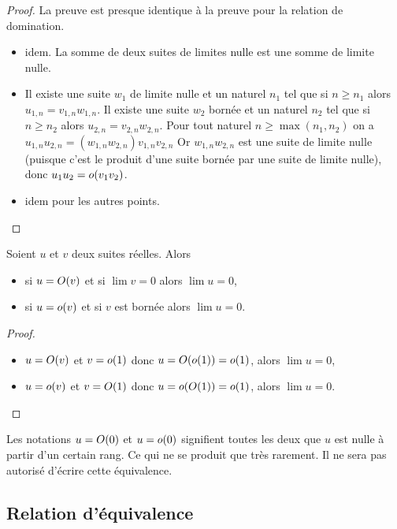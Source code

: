 \begin{proof}
  La preuve est presque identique à la preuve pour la relation de domination.
  \begin{itemize}
  \item idem. La somme de deux suites de limites nulle est une somme de limite nulle.
  \item Il existe une suite \(w_1\) de limite nulle et un naturel \(n_1\) tel que si \(n \geqslant n_1\) alors \(u_{1,n}=v_{1,n} w_{1,n}\). Il existe une suite \(w_2\) bornée et un naturel \(n_2\) tel que si \(n \geqslant n_2\) alors \(u_{2,n}=v_{2,n} w_{2,n}\). Pour tout naturel \(n \geqslant \max(n_1,n_2)\) on a \(u_{1,n}u_{2,n} = (w_{1,n}w_{2,n}) v_{1,n}v_{2,n}\) Or \(w_{1,n}w_{2,n}\) est une suite de limite nulle (puisque c'est le produit d'une suite bornée par une suite de limite nulle), donc \(u_1u_2=o\mathopen{}\left(v_1 v_2\right)\).
  \item idem pour les autres points.
  \end{itemize}
\end{proof}
\begin{prop}
  Soient \(u\) et \(v\) deux suites réelles. Alors
  \begin{itemize}
  \item si \(u=O\mathopen{}\left(v\right)\) et si \(\lim v=0\) alors \(\lim u=0\),
  \item si \(u=o\mathopen{}\left(v\right)\) et si \(v\) est bornée alors \(\lim u=0\).
  \end{itemize}
\end{prop}
\begin{proof}
  \begin{itemize}
  \item \(u=O\mathopen{}\left(v\right)\) et \(v=o\mathopen{}\left(1\right)\) donc \(u=O\mathopen{}\left(o\mathopen{}\left(1\right)\right)=o\mathopen{}\left(1\right)\), alors \(\lim u =0\),
  \item \(u=o\mathopen{}\left(v\right)\) et \(v=O\mathopen{}\left(1\right)\) donc \(u=o\mathopen{}\left(O\mathopen{}\left(1\right)\right)=o\mathopen{}\left(1\right)\), alors \(\lim u =0\).
  \end{itemize}
\end{proof}

\danger Les notations \(u=O\mathopen{}\left(0\right)\) et \(u=o\mathopen{}\left(0\right)\) signifient toutes les deux que \(u\) est nulle à partir d'un certain rang. Ce qui ne se produit que très rarement. Il ne sera pas autorisé d'écrire cette équivalence.

\subsection{Relation d'équivalence}

